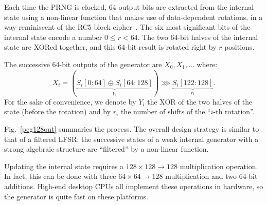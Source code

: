 \documentclass[submission,svgnames,journal=tosc]{iacrtrans}
\begin{document}
Each time the PRNG is clocked, 64 output bits are extracted from the internal
state using a non-linear function that makes use of data-dependent rotations, in
a way reminiscent of the \textsf{RC5} block cipher~\cite{Rivest94}. The six most
significant bits of the internal state encode a number $0 \leq r < 64$. The two
64-bit halves of the internal state are XORed together, and this 64-bit result
is rotated right by $r$ positions.

The successive 64-bit outputs of the generator are $X_0, X_1, \dots$ where:
\begin{equation}\label{eq:output}
  X_i =(\underbrace{S_i[0:64] \oplus S_i[64:128]}_{Y_i}) \ggg \underbrace{S_i[122:128]}_{r_i}.
\end{equation}
For the sake of convenience, we denote by $Y_i$ the XOR of the two halves of the
state (before the rotation) and by $r_i$ the number of shifts of the ``$i$-th
rotation''.

Fig.~\ref{pcg128out} summaries the process. The overall design strategy is
similar to that of a filtered LFSR: the successive states of a weak internal
generator with a strong algebraic structure are ``filtered'' by a non-linear
function.

Updating the internal state requires a $128 \times 128 \rightarrow 128$
multiplication operation. In fact, this can be done with three
$64 \times 64 \rightarrow 128$ multiplication and two 64-bit additions. High-end
desktop CPUs all implement these operations in hardware, so the generator is
quite fast on these platforms.
\end{document}
